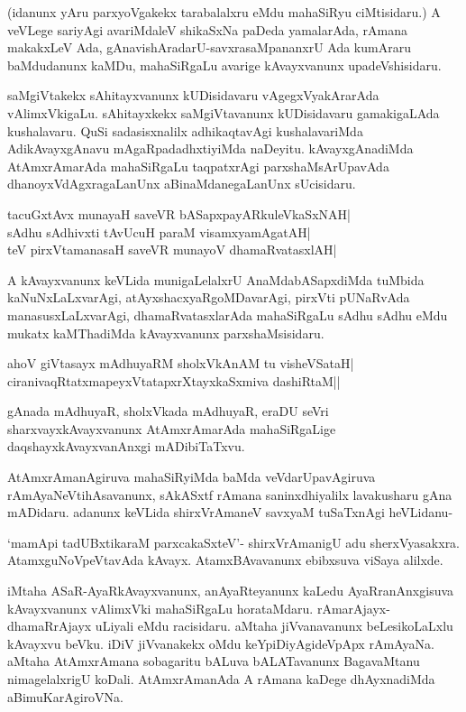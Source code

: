 (idanunx yAru parxyoVgakekx tarabalalxru eMdu mahaSiRyu ciMtisidaru.) A veVLege sariyAgi avariMdaleV shikaSxNa paDeda yamalarAda, rAmana makakxLeV Ada, gAnavishAradarU-savxrasaMpananxrU Ada kumAraru baMdudanunx kaMDu, mahaSiRgaLu avarige kAvayxvanunx upadeVshisidaru. 

saMgiVtakekx sAhitayxvanunx kUDisidavaru vAgegxVyakArarAda vAlimxVkigaLu. sAhitayxkekx saMgiVtavanunx kUDisidavaru gamakigaLAda kushalavaru. QuSi sadasisxnalilx adhikaqtavAgi kushalavariMda AdikAvayxgAnavu mAgaRpadadhxtiyiMda naDeyitu. kAvayxgAnadiMda AtAmxrAmarAda mahaSiRgaLu taqpatxrAgi parxshaMsArUpavAda dhanoyxVdAgxragaLanUnx aBinaMdanegaLanUnx sUcisidaru. 

\begin{shloka} 
tacuGxtAvx munayaH saveVR bASapxpayARkuleVkaSxNAH|\label{158}\\ 
sAdhu sAdhivxti tAvUcuH paraM visamxyamAgatAH|\\ 
teV pirxVtamanasaH saveVR munayoV dhamaRvatasxlAH|
\end{shloka} 

A kAvayxvanunx keVLida munigaLelalxrU AnaMdabASapxdiMda tuMbida kaNuNxLaLxvarAgi, atAyxshacxyaRgoMDavarAgi, pirxVti pUNaRvAda manasusxLaLxvarAgi, dhamaRvatasxlarAda mahaSiRgaLu sAdhu sAdhu eMdu mukatx kaMThadiMda kAvayxvanunx parxshaMsisidaru. 

\begin{shloka} 
ahoV giVtasayx mAdhuyaRM sholxVkAnAM tu visheVSataH|\label{159}\\ 
ciranivaqRtatxmapeyxVtatapxrXtayxkaSxmiva dashiRtaM||
\end{shloka} 

gAnada mAdhuyaR, sholxVkada mAdhuyaR, eraDU seVri sharxvayxkAvayxvanunx AtAmxrAmarAda mahaSiRgaLige daqshayxkAvayxvanAnxgi mADibiTaTxvu. 

AtAmxrAmanAgiruva mahaSiRyiMda baMda veVdarUpavAgiruva rAmAyaNeVtihAsavanunx, sAkASxtf rAmana saninxdhiyalilx lavakusharu gAna mADidaru. adanunx keVLida shirxVrAmaneV savxyaM tuSaTxnAgi heVLidanu- 

`mamApi tadUBxtikaraM parxcakaSxteV'-\label{159a} shirxVrAmanigU adu sherxVyasakxra. AtamxguNoVpeVtavAda kAvayx. AtamxBAvavanunx ebibxsuva viSaya alilxde. 

iMtaha ASaR-AyaRkAvayxvanunx, anAyaRteyanunx kaLedu AyaRranAnxgisuva kAvayxvanunx vAlimxVki mahaSiRgaLu horataMdaru. rAmarAjayx-dhamaRrAjayx uLiyali eMdu racisidaru. aMtaha jiVvanavanunx beLesikoLaLxlu kAvayxvu beVku. iDiV jiVvanakekx oMdu keYpiDiyAgideVpApx rAmAyaNa. aMtaha AtAmxrAmana sobagaritu bALuva bALATavanunx BagavaMtanu nimagelalxrigU koDali. AtAmxrAmanAda A rAmana kaDege dhAyxnadiMda aBimuKarAgiroVNa. 

